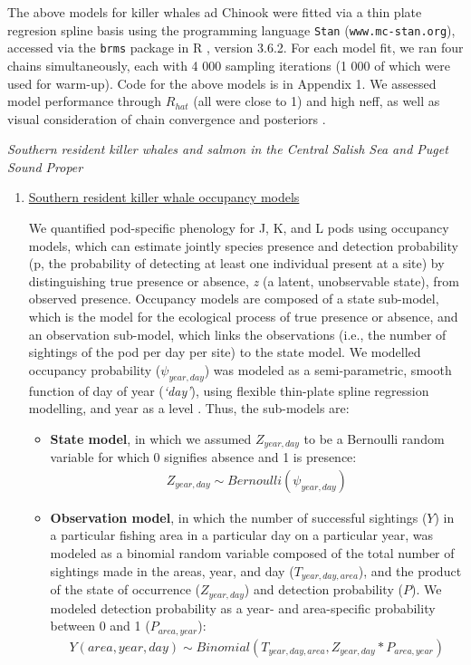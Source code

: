 \documentclass{article}
\begin{document}
The above models for killer whales ad Chinook were fitted via a thin plate regresion spline basis using the programming language \texttt{Stan} \citep{Carpenter:2016aa} (\texttt{www.mc-stan.org}), accessed via the \texttt{brms}\citep{brms2018} package in R \citep{Rcore2019}, version 3.6.2. For each model fit, we ran four chains simultaneously, each with 4 000 sampling iterations (1 000 of which were used for warm-up). Code for the above models is in Appendix 1. We assessed model performance through $R_{hat}$ (all were close to 1) and high neff, as well as visual consideration of chain convergence and posteriors \citep{BDA}.
\par \emph{Southern resident killer whales and salmon in the Central Salish Sea and Puget Sound Proper}
\begin{enumerate}
\item \underline {Southern resident killer whale occupancy models}
\par We quantified pod-specific phenology for J, K, and L pods using occupancy models, which can estimate jointly species presence and detection probability (p, the probability of detecting at least one individual present at a site) by distinguishing true presence or absence, \emph{z} (a latent, unobservable state), from observed presence. Occupancy models are composed of a state sub-model, which is the model for the ecological process of true presence or absence, and an observation sub-model, which links the observations (i.e., the number of sightings of the pod per day per site) to the state model. We modelled occupancy probability ($\psi_{year,day}$) was modeled as a semi-parametric, smooth function of day of year (\emph{`day'}), using flexible thin-plate spline regression modelling, and year as a level \citep{strebel2014}. Thus, the sub-models are:
\begin{itemize}

\item \textbf{State model}, in which we assumed $Z_{year,day}$ to be a Bernoulli random variable for which 0 signifies absence and 1 is presence:
 \begin{align*}
Z_{year,day} \sim Bernoulli (\psi_{year,day})
\end{align*}
  \item \textbf{Observation model}, in which the number of successful sightings ($Y$) in a particular fishing area in a particular day on a particular year, was modeled as a binomial random variable composed of the total number of sightings made in the areas, year, and day ($T_{year,day,area}$), and the product of the state of occurrence ($Z_{year,day}$) and detection probability ($P$). We modeled detection probability as a year- and area-specific probability between 0 and 1 ($P_{area,year}$):
\begin{align*}
Y(area,year,day) \sim Binomial (T_{year, day,area},Z_{year,day}*P_{area,year})
\end{align*}
                                                                             \end{itemize}                                                       


\end{enumerate}
\end{document}
